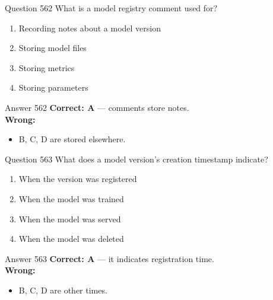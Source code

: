 \documentclass[aspectratio=169,11pt]{beamer}
\begin{document}
	\begin{frame}{Question 562}
		What is a model registry comment used for?
		\begin{enumerate}[label=\Alph*.]
			\item Recording notes about a model version
			\item Storing model files
			\item Storing metrics
			\item Storing parameters
		\end{enumerate}
	\end{frame}
	\begin{frame}{Answer 562}
		\textbf{Correct: A} --- comments store notes.\\
		\vspace{0.5em}
		\textbf{Wrong:}
		\begin{itemize}
			\item B, C, D are stored elsewhere.
		\end{itemize}
	\end{frame}
	
	\begin{frame}{Question 563}
		What does a model version's creation timestamp indicate?
		\begin{enumerate}[label=\Alph*.]
			\item When the version was registered
			\item When the model was trained
			\item When the model was served
			\item When the model was deleted
		\end{enumerate}
	\end{frame}
	\begin{frame}{Answer 563}
		\textbf{Correct: A} --- it indicates registration time.\\
		\vspace{0.5em}
		\textbf{Wrong:}
		\begin{itemize}
			\item B, C, D are other times.
		\end{itemize}
	\end{frame}
	
\end{document}
